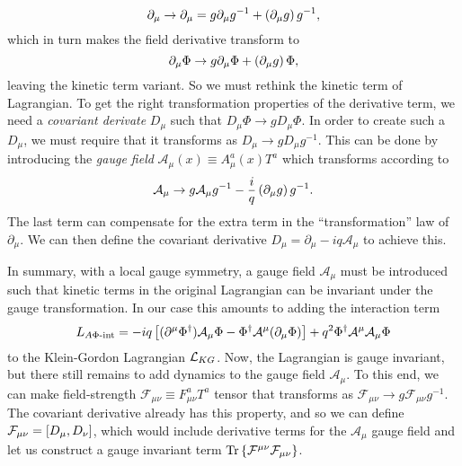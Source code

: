 \documentclass[../main.tex]{subfiles}
\begin{document}
\begin{equation}
    \partial_\mu \to \partial_\mu = g \partial_\mu g^{-1} + \left(\partial_\mu g\right) g^{-1},
\end{equation}
which in turn makes the field derivative transform to
\begin{equation}
    \partial_\mu \Phi \to g \partial_\mu \Phi + \left(\partial_\mu g\right) \Phi,
\end{equation}
leaving the kinetic term variant.
So we must rethink the kinetic term of Lagrangian.
To get the right transformation properties of the derivative term, we need a \textit{covariant derivate } \(D_\mu\) such that \(D_\mu \Phi \to g D_\mu \Phi\).
In order to create such a \(D_\mu\), we must require that it transforms as \(D_\mu \to g D_\mu g^{-1}\).
This can be done by introducing the \textit{gauge field} \(\mathcal{A}_\mu(x) \equiv A_\mu^a(x) T^a\) which transforms according to
\begin{equation}
    \mathcal{A}_\mu \to g \mathcal{A}_\mu g^{-1} - \frac{i}{q} \left(\partial_\mu g\right) g^{-1}.
\end{equation}
The last term can compensate for the extra term in the ``transformation'' law of \(\partial_\mu\).
We can then define the covariant derivative \(D_\mu = \partial_\mu - iq \mathcal{A}_\mu\) to achieve this.
\medskip

In summary, with a local gauge symmetry, a gauge field \(\mathcal{A}_\mu\) must
be introduced such that kinetic terms in the original Lagrangian can be
invariant under the gauge transformation. In our case this amounts to adding
the interaction term
\begin{equation}
    L_{A\Phi\text{-int}} = -iq\left[(\partial^\mu \Phi^\dagger) \mathcal{A}_\mu \Phi - \Phi^\dagger \mathcal{A}^\mu (\partial_\mu \Phi)\right] + q^2 \Phi^\dagger \mathcal{A}^\mu \mathcal{A}_\mu \Phi
\end{equation}
to the Klein-Gordon Lagrangian \(\mathcal{L}_{KG}\).
Now, the Lagrangian is gauge invariant, but there still remains to add dynamics to the gauge field \(\mathcal{A}_\mu\).
To this end, we can make field-strength \(\mathcal{F}_{\mu\nu} \equiv F_{\mu\nu}^a T^a\) tensor that transforms as \(\mathcal{F}_{\mu\nu} \to g \mathcal{F}_{\mu\nu} g^{-1}\).
The covariant derivative already has this property, and so we can define \(\mathcal{F}_{\mu\nu} = \left[D_\mu,D_\nu\right]\), which would include derivative terms for the \(\mathcal{A}_\mu\) gauge field and let us construct a gauge invariant term \(\operatorname{Tr}\left\{\mathcal{F}^{\mu\nu} \mathcal{F}_{\mu\nu}\right\}\).
\end{document}
